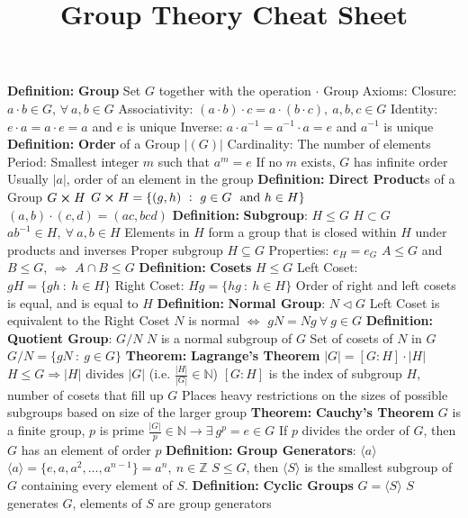 \documentclass[14pt]{extarticle}
\title{Group Theory Cheat Sheet}
\def\Definition{{\color{blue} \textbf{Definition:} }}
\def\Theorem{{\color{red} \textbf{Theorem:} }}
\begin{document}
	\maketitle
	\begin{outline}		
		\1	\Definition \textbf{Group}
			\2	Set $G$ together with the operation $\cdot$
			\2	Group Axioms:
				\3	Closure:	$a \cdot b \in G$, $\forall~a,b \in G$
				\3	Associativity:	$(a \cdot b) \cdot c = a \cdot (b \cdot c),~a,b,c \in G$
				\3	Identity:	$e \cdot a = a \cdot e = a$ and $e$ is unique
				\3	Inverse: $a \cdot a^{-1} = a^{-1} \cdot a = e$ and $a^{-1}$ is unique
		\1	\Definition \textbf{Order} of a Group $|(G)|$
			\2	Cardinality:	The number of elements
			\2	Period:	Smallest integer $m$ such that $a^m = e$
				\3	If no $m$ exists, $G$ has infinite order
				\3	Usually $|a|$, order of an element in the group
		\1	\Definition \textbf{Direct Product}s of a Group $G \cross H$
			\2	$G \cross H = \{(g,h)~:~g \in G~\text{ and } h \in H\}$
			\2	$(a,b) \cdot (c,d) = (ac,bcd)$
		\1	\Definition \textbf{Subgroup}: $H \le G$
			\2	$H \subset G$
			\2	$ab^{-1} \in H,~\forall~a,b \in H$
			\2	Elements in $H$ form a group that is closed within $H$ under products and inverses
			\2	Proper subgroup $H \subseteq G$
			\2	Properties:
				\3	$e_H = e_G$
				\3	$A \le G$ and $B \le G$, $\Rightarrow$ $A \cap B \le G$
		\1	\Definition \textbf{Cosets}
			\2	$H \le G$
			\2	Left Coset:	 $gH = \{gh~:~h \in H\}$
			\2	Right Coset: $Hg = \{hg~:~h \in H\}$	
			\2	Order of right and left cosets is equal, and is equal to $H$
		\1	\Definition \textbf{Normal Group}: $N \triangleleft G$
			\2	Left Coset is equivalent to the Right Coset
			\2	$N$ is normal $\Leftrightarrow$ $gN = Ng~\forall~g \in G$
		\1	\Definition \textbf{Quotient Group}: $G/N$
			\2	$N$ is a normal subgroup of $G$
			\2	Set of cosets of $N$ in $G$
			\2	$G/N = \{g N~:~g \in G\}$	
		\1	\Theorem \textbf{Lagrange's Theorem}
			\2	$|G| = [G:H] \cdot |H|$
			\2	{\color{purple}$H \le G \Rightarrow |H| \text{ divides } |G|$ 
					(i.e. $\frac{|H|}{|G|} \in \mathbb{N}$)}
			\2	$[G : H]$ is the index of subgroup $H$, number of cosets that fill
					up $G$
			\2	Places heavy restrictions on the sizes of possible subgroups based
					on size of the larger group
		\1	\Theorem \textbf{Cauchy's Theorem}
			\2	$G$ is a finite group, $p$ is prime
			\2	{\color{purple}$\frac{|G|}{p} \in \mathbb{N} \rightarrow \exists~g^p = e \in G$}
			\2	If $p$ divides the order of $G$, then $G$ has an element of order $p$
		\1	\Definition \textbf{Group Generators}: $\langle a \rangle$
			\2	$\langle a \rangle = \{e,a,a^2,...,a^{n-1}\} = a^n,~n \in \mathbb{Z}$
			\2	$S \le G$, then $\langle S \rangle$ is the smallest subgroup of $G$ containing
					every element of $S$.
		\1	\Definition \textbf{Cyclic Groups}
			\2	$G = \langle S \rangle$
			\2	$S$ generates $G$, elements of $S$ are group generators	
		

\end{outline}
\end{document}
